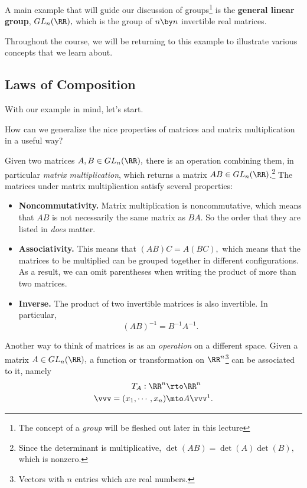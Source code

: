 \begin{example}[$GL_n(\RR)$]
A main example that will guide our discussion of groups\footnote{The concept of a \emph{group} will be fleshed out later in this lecture} is the \textbf{general linear group}, $GL_n(\RR),$ which is the group of $n \by n$ invertible real matrices.
\end{example}

Throughout the course, we will be returning to this example to illustrate various concepts that we learn about.

\subsection{Laws of Composition}
With our example in mind, let's start.
\begin{qq}
How can we generalize the nice properties of matrices and matrix multiplication in a useful way?
\end{qq}

Given two matrices $A, B \in GL_n(\RR),$ there is an operation combining them, in particular \emph{matrix multiplication}, which returns a matrix $AB \in GL_n(\RR)$.\footnote{Since the determinant is multiplicative, $\det(AB) = \det(A)\det(B),$ which is nonzero.} The matrices under matrix multiplication satisfy several properties:
\begin{itemize}
    \item \textbf{Noncommutativity.} Matrix multiplication is noncommutative, which means that $AB$ is not necessarily the same matrix as $BA.$ So the order that they are listed in \emph{does} matter.
    \item \textbf{Associativity.} This means that $(AB)C = A(BC),$ which means that the matrices to be multiplied can be grouped together in different configurations. As a result, we can omit parentheses when writing the product of more than two matrices.

    \item \textbf{Inverse.} The product of two invertible matrices is also invertible. In particular,
    \[
    (AB)^{-1} = B^{-1}A^{-1}.
    \]
\end{itemize}

Another way to think of matrices is as an \emph{operation} on a different space. Given a matrix $A \in GL_n(\RR),$ a function or transformation on $\RR^n$\footnote{Vectors with $n$ entries which are real numbers.} can be associated to it, namely
\begin{align*}
    T_A: \RR^n &\rto \RR^n \\
    \vvv = (x_1, \cdots, x_n) &\mto A\vvv \footnotemark.
\end{align*}

